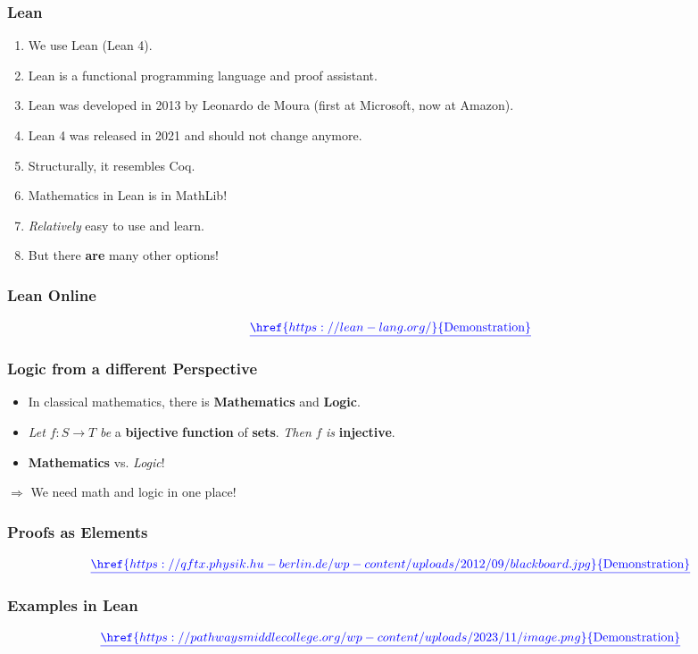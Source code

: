 \documentclass{beamer}
\theoremstyle{definition}
\theoremstyle{remark}
\begin{document}
\begin{frame}
	\frametitle{Lean}
		\begin{enumerate}
			\item We use Lean (Lean 4).
			\item Lean is a functional programming language and proof assistant.
			\item Lean was developed in 2013 by Leonardo de Moura (first at Microsoft, now at Amazon).
			\item Lean 4 was released in 2021 and should not change anymore.
			\item Structurally, it resembles Coq. 
			\item Mathematics in Lean is in MathLib! 
			\item \emph{Relatively} easy to use and learn.
			\item But there \textbf{are} many other options!
		\end{enumerate}
\end{frame}

\begin{frame}
	\frametitle{Lean Online}
	
	\[
		{\color{blue}\underline{\href{https://lean-lang.org/}{\text{Demonstration}}}}
	\]
\end{frame}
\begin{frame}
	\frametitle{Logic from a different Perspective}
	\begin{itemize}
		\item In classical mathematics, there is \textbf{Mathematics} and \textbf{Logic}.
		\item \emph{Let} $f\colon S \to T$ \emph{be} a \textbf{bijective} \textbf{function} of \textbf{sets}. \emph{Then} $f$ \emph{is} \textbf{injective}. 
		\item \textbf{Mathematics} vs. \emph{Logic}! \vspace{1cm}
	\end{itemize}
 $\Rightarrow$ We need math and logic in one place!
\end{frame}

\begin{frame}
	\frametitle{Proofs as Elements}
	\[
		{\color{blue}\underline{\href{https://qftx.physik.hu-berlin.de/wp-content/uploads/2012/09/blackboard.jpg}{\text{Demonstration}}}}
	\]
\end{frame}


\begin{frame}
	\frametitle{Examples in Lean}
	\[
		{\color{blue}\underline{\href{https://pathwaysmiddlecollege.org/wp-content/uploads/2023/11/image.png}{\text{Demonstration}}}}
	\]
\end{frame}
\end{document}
